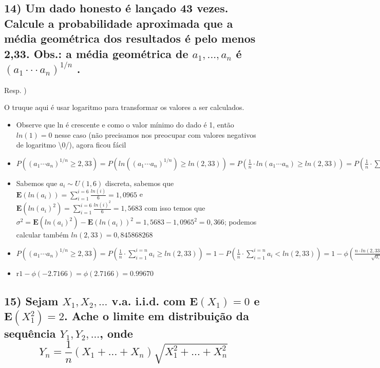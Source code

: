 \documentclass[english]{article}
\begin{document}
\subsection*{\textcompwordmark{}}


\subsection*{\textmd{14) Um dado honesto é lançado 43 vezes. Calcule a probabilidade
aproximada que a média geométrica dos resultados é pelo menos 2,33.
Obs.: a média geométrica de $a_{1},...,a_{n}$ é $(a_{1}\cdot\cdot\cdot a_{n})^{1/n}$
.}}

Resp. )

O truque aqui é usar logaritmo para transformar os valores a ser calculados.
\begin{itemize}
\item Observe que ln é crescente e como o valor mínimo do dado é 1, então
$ln(1)=0$ nesse caso (não precisamos nos preocupar com valores negativos
de logaritmo \textbackslash{}0/), agora ficou fácil
\item $P((a_{1}\text{···}a_{n})^{1/n}\ge2,33)=P(ln((a_{1}\text{···}a_{n})^{1/n})\ge ln(2,33))=P(\frac{1}{n}\cdot ln(a_{1}\text{···}a_{n})\ge ln(2,33))=P(\frac{1}{n}\cdot\sum_{i=1}^{i=n}a_{i}\ge ln(2,33))$
\item Sabemos que $a_{i}\sim U(1,6)$ discreta, sabemos que $\mathbf{E}(ln(a_{i}))=\sum_{i=1}^{i=6}\frac{ln(i)}{6}=1,0965$
e $\mathbf{E}(ln(a_{i})^{2})=\sum_{i=1}^{i=6}\frac{ln(i)^{2}}{6}=1,5683$
com isso temos que $\sigma^{2}=\mathbf{E}(ln(a_{i})^{2})-\mathbf{E}(ln(a_{i}))^{2}=1,5683-1,0965^{2}=0,366$;
podemos calcular também $ln(2,33)=0,845868268$
\item $P((a_{1}\text{···}a_{n})^{1/n}\ge2,33)=P(\frac{1}{n}\cdot\sum_{i=1}^{i=n}a_{i}\ge ln(2,33))=1-P(\frac{1}{n}\cdot\sum_{i=1}^{i=n}a_{i}<ln(2,33))=1-\phi(\frac{n\cdot ln(2,33)-n\cdot1,0965}{\sqrt{0,366\cdot n}})=1-\phi(\frac{43\cdot ln(2,33)-43\cdot1,0965}{\sqrt{0,366\cdot43}})=$
\item r$1-\phi(-2.7166)=\phi(2.7166)=0.99670$
\end{itemize}

\subsection*{\textcompwordmark{}}


\subsection*{\textmd{15) Sejam $X_{1},X_{2},...$ v.a. i.i.d. com $\mathbf{E}(X_{1})=0$
e $\mathbf{E}(X_{1}^{2})=2$. Ache o limite em distribuição da sequência
$Y_{1},Y_{2},...$, onde 
\[
Y_{n}=\frac{1}{n}(X_{1}+...+X_{n})\sqrt{X_{1}^{2}+...+X_{n}^{2}}
\]
}}
\end{document}
